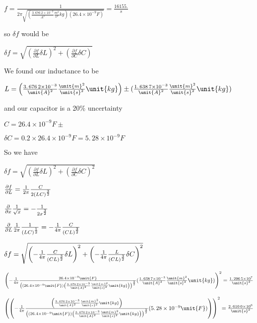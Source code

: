 \documentclass{sebase}
\begin{document}
$f=\frac{1}{2\pi \sqrt{\left( \allowbreak \frac{3.\,\allowbreak 676\,2\times
10^{-3}}{\unit{A}^{2}}\frac{\unit{m}^{2}}{\unit{s}^{2}}\unit{kg}\right)
\left( 26.4\times 10^{-9}\unit{F}\right) }}=\allowbreak \frac{16155.}{\unit{s%
}}$

so $\delta f$ would be

$\delta f=\sqrt{\left( \frac{\partial f}{\partial L}\delta L\right)
^{2}+\left( \frac{\partial f}{\partial C}\delta C\right) }$

We found our inductance to be

$L=\left( \allowbreak \frac{3.\,\allowbreak 676\,2\times 10^{-3}}{\unit{A}%
^{2}}\frac{\unit{m}^{2}}{\unit{s}^{2}}\unit{kg}\right) \pm (\frac{%
1.\,\allowbreak 638\,7\times 10^{-3}}{\unit{A}^{2}}\frac{\unit{m}^{2}}{\unit{%
s}^{2}}\unit{kg})$ 

and our capacitor is a 20\% uncertainty 

$C=26.4\times 10^{-9}\unit{F}\pm $

$\delta C=0.2\times 26.4\times 10^{-9}\unit{F}=\allowbreak 5.\,\allowbreak
28\times 10^{-9}\unit{F}$

So we have 

$\delta f=\sqrt{\left( \frac{\partial f}{\partial L}\delta L\right)
^{2}+\left( \frac{\partial f}{\partial C}\delta C\right) ^{2}}$

$\frac{\partial f}{\partial L}=\frac{1}{2\pi }\frac{C}{2\left( LC\right) ^{%
\frac{3}{2}}}$

$\frac{\partial }{\partial x}\frac{1}{\sqrt{x}}=\allowbreak -\frac{1}{2x^{%
\frac{3}{2}}}$

$\frac{\partial }{\partial L}\frac{1}{2\pi }\frac{1}{\left( LC\right) ^{%
\frac{1}{2}}}=\allowbreak -\frac{1}{4\pi }\frac{C}{\left( CL\right) ^{\frac{3%
}{2}}}$

\bigskip $\delta f=\sqrt{\left( -\frac{1}{4\pi }\frac{C}{\left( CL\right) ^{%
\frac{3}{2}}}\delta L\right) ^{2}+\left( -\frac{1}{4\pi }\frac{L}{\left(
CL\right) ^{\frac{3}{2}}}\delta C\right) ^{2}}$

\bigskip $\left( -\frac{1}{4\pi }\frac{26.4\times 10^{-9}\unit{F}}{\left(
\left( 26.4\times 10^{-9}\unit{F}\right) \left( \allowbreak \frac{%
3.\,\allowbreak 676\,2\times 10^{-3}}{\unit{A}^{2}}\frac{\unit{m}^{2}}{\unit{%
s}^{2}}\unit{kg}\right) \right) ^{\frac{3}{2}}}(\frac{1.\,\allowbreak
638\,7\times 10^{-3}}{\unit{A}^{2}}\frac{\unit{m}^{2}}{\unit{s}^{2}}\unit{kg}%
)\right) ^{2}=\allowbreak \frac{1.\,\allowbreak 296\,5\times 10^{7}}{\unit{s}%
^{2}}$

$\left( \left( -\frac{1}{4\pi }\frac{\left( \frac{3.\,\allowbreak
676\,2\times 10^{-3}}{\unit{A}^{2}}\frac{\unit{m}^{2}}{\unit{s}^{2}}\unit{kg}%
\right) }{\left( \left( 26.4\times 10^{-9}\unit{F}\right) \left( \allowbreak 
\frac{3.\,\allowbreak 676\,2\times 10^{-3}}{\unit{A}^{2}}\frac{\unit{m}^{2}}{%
\unit{s}^{2}}\unit{kg}\right) \right) ^{\frac{3}{2}}}(\allowbreak
5.\,\allowbreak 28\times 10^{-9}\unit{F})\right) \right) ^{2}=\allowbreak 
\frac{2.\,\allowbreak 610\,0\times 10^{6}}{\unit{s}^{2}}$
\end{document}
